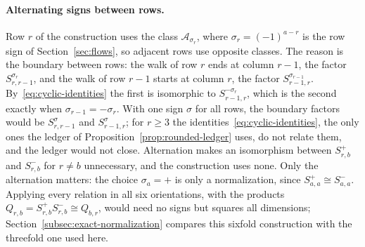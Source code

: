 \paragraph{Alternating signs between rows.}
Row \(r\) of the construction uses the class \(\mathcal A_{\sigma_r}\), where
\(\sigma_r=(-1)^{a-r}\) is the row sign of Section~\ref{sec:flows}, so
adjacent rows use opposite classes. The reason is the boundary between
rows: the walk of row \(r\) ends at column \(r-1\), the factor
\(S^{\sigma_r}_{r,r-1}\), and the walk of row \(r-1\) starts at column
\(r\), the factor \(S^{\sigma_{r-1}}_{r-1,r}\).
By~\eqref{eq:cyclic-identities} the first is isomorphic to
\(S^{-\sigma_r}_{r-1,r}\), which is the second exactly when
\(\sigma_{r-1}=-\sigma_r\). With one sign \(\sigma\) for all rows, the
boundary factors would be \(S^\sigma_{r,r-1}\) and \(S^\sigma_{r-1,r}\);
for \(r\ge3\) the identities~\eqref{eq:cyclic-identities}, the only ones the
ledger of Proposition~\ref{prop:rounded-ledger} uses, do not relate them,
and the ledger would not close. Alternation makes an isomorphism between
\(S^+_{r,b}\) and \(S^-_{r,b}\) for \(r\ne b\) unnecessary, and the
construction uses none. Only the alternation matters: the choice \(\sigma_a=+\) is only a normalization, since
\(S^+_{a,a}\cong S^-_{a,a}\). Applying every relation in all six
orientations, with the products \(Q_{r,b}=S^+_{r,b}S^-_{r,b}\cong Q_{b,r}\),
would need no signs but squares all dimensions;
Section~\ref{subsec:exact-normalization} compares this sixfold
construction with the threefold one used here.

